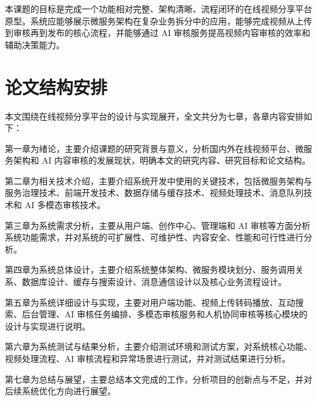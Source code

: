 本课题的目标是完成一个功能相对完整、架构清晰、流程闭环的在线视频分享平台原型。系统应能够展示微服务架构在复杂业务拆分中的应用，能够完成视频从上传到审核再到发布的核心流程，并能够通过 AI 审核服务提高视频内容审核的效率和辅助决策能力。

\section{论文结构安排}

本文围绕在线视频分享平台的设计与实现展开，全文共分为七章，各章内容安排如下：

第一章为绪论，主要介绍课题的研究背景与意义，分析国内外在线视频平台、微服务架构和 AI 内容审核的发展现状，明确本文的研究内容、研究目标和论文结构。

第二章为相关技术介绍，主要介绍系统开发中使用的关键技术，包括微服务架构与服务治理技术、前端开发技术、数据存储与缓存技术、视频处理技术、消息队列技术和 AI 多模态审核技术。

第三章为系统需求分析，主要从用户端、创作中心、管理端和 AI 审核等方面分析系统功能需求，并对系统的可扩展性、可维护性、内容安全、性能和可行性进行分析。

第四章为系统总体设计，主要介绍系统整体架构、微服务模块划分、服务调用关系、数据库设计、缓存与搜索设计、消息通信设计以及核心业务流程设计。

第五章为系统详细设计与实现，主要对用户端功能、视频上传转码播放、互动搜索、后台管理、AI 审核任务编排、多模态审核服务和人机协同审核等核心模块的设计与实现进行说明。

第六章为系统测试与结果分析，主要介绍测试环境和测试方案，对系统核心功能、视频处理流程、AI 审核流程和异常场景进行测试，并对测试结果进行分析。

第七章为总结与展望，主要总结本文完成的工作，分析项目的创新点与不足，并对后续系统优化方向进行展望。
